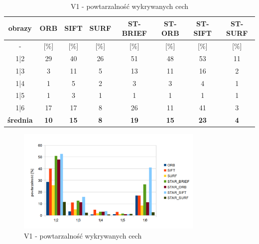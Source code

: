 \begin{table}[htbp]
  \centering
  \caption{V1 - powtarzalność wykrywanych cech}
    \begin{tabular}{|c|c|c|c|c|c|c|c|}\hline

    obrazy & \textbf{ORB} & \textbf{SIFT} & \textbf{SURF} & \textbf{ST-BRIEF} & \textbf{ST-ORB} & \textbf{ST-SIFT} & \textbf{ST-SURF} \\\hline

    -  & [\%] & [\%] & [\%] & [\%] & [\%] & [\%] & [\%] \\\hline
    1|2 & 29 & 40 & 26 & 51 & 48 & 53 & 11 \\
    1|3 & 3 & 11 & 5 & 13 & 11 & 16 & 2 \\
    1|4 & 1 & 5 & 2 & 3 & 3 & 4 & 1 \\
    1|5 & 1 & 3 & 1 & 1 & 1 & 1 & 1 \\
    1|6 & 17 & 17 & 8 & 26 & 11 & 41 & 3 \\\hline
    \textbf{średnia} & \textbf{10} & \textbf{15} & \textbf{8} & \textbf{19} & \textbf{15} & \textbf{23} & \textbf{4} \\\hline
   

    \end{tabular}%
  \label{tab:v1_m1}%
\end{table}%


\begin{figure}
\centering
\includegraphics[width=0.8\textwidth]{pict/slowik/v1/m1.png}
\caption{V1 - powtarzalność wykrywanych cech}
\label{fig:v1_m1}
\end{figure}

